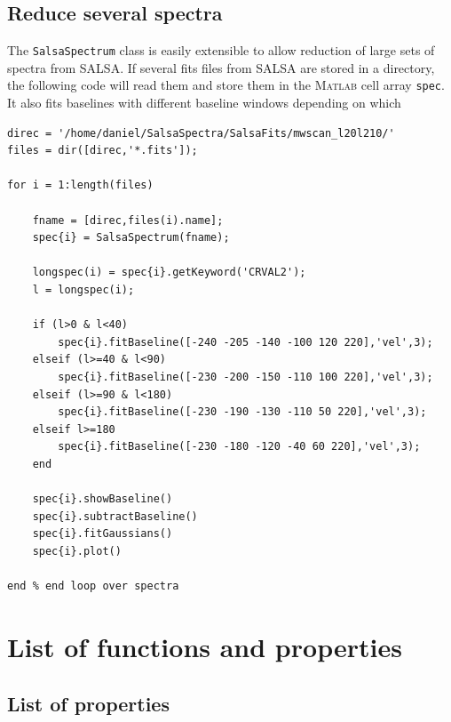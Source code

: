\documentclass[11pt,a4paper]{article}
\begin{document}
\subsection{Reduce several spectra}
\label{sec:reduce-sever-spectra}

The \texttt{SalsaSpectrum} class is easily extensible to allow
reduction of large sets of spectra from SALSA. If several fits files
from SALSA are stored in a directory, the following code will read
them and store them in the \textsc{Matlab} cell array \texttt{spec}. It also
fits baselines with different baseline windows depending on which 


\begin{lstlisting}
direc = '/home/daniel/SalsaSpectra/SalsaFits/mwscan_l20l210/'
files = dir([direc,'*.fits']);

for i = 1:length(files)

    fname = [direc,files(i).name];
    spec{i} = SalsaSpectrum(fname);
    
    longspec(i) = spec{i}.getKeyword('CRVAL2');
    l = longspec(i);
        
    if (l>0 & l<40)
        spec{i}.fitBaseline([-240 -205 -140 -100 120 220],'vel',3);
    elseif (l>=40 & l<90)
        spec{i}.fitBaseline([-230 -200 -150 -110 100 220],'vel',3);
    elseif (l>=90 & l<180)
        spec{i}.fitBaseline([-230 -190 -130 -110 50 220],'vel',3);
    elseif l>=180
        spec{i}.fitBaseline([-230 -180 -120 -40 60 220],'vel',3);        
    end
    
    spec{i}.showBaseline()    
    spec{i}.subtractBaseline()
    spec{i}.fitGaussians()
    spec{i}.plot()  

end % end loop over spectra
\end{lstlisting}


\newpage

\section{List of functions and properties}
\label{sec:list-funct-param}

\subsection{List of properties}
\label{sec:list-properties}
\end{document}
